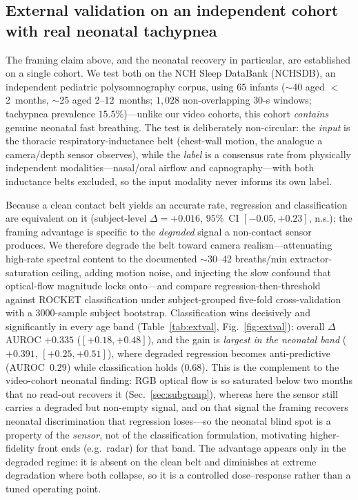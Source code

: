 \subsection{External validation on an independent cohort with real neonatal tachypnea}\label{sec:extval}
The framing claim above, and the neonatal recovery in particular, are established on a single
cohort. We test both on the NCH Sleep DataBank (NCHSDB), an independent pediatric polysomnography
corpus, using $65$ infants ($\sim$40 aged $<$2~months, $\sim$25 aged 2--12~months; $1{,}028$
non-overlapping $30$-s windows; tachypnea prevalence $15.5\%$)---unlike our video cohorts, this
cohort \emph{contains} genuine neonatal fast breathing. The test is deliberately non-circular: the
\emph{input} is the thoracic respiratory-inductance belt (chest-wall motion, the analogue a
camera/depth sensor observes), while the \emph{label} is a consensus rate from physically independent
modalities---nasal/oral airflow and capnography---with both inductance belts excluded, so the input
modality never informs its own label.

Because a clean contact belt yields an accurate rate, regression and classification are equivalent on
it (subject-level $\Delta{=}{+}0.016$, $95\%$~CI $[-0.05,{+}0.23]$, n.s.); the framing advantage is
specific to the \emph{degraded} signal a non-contact sensor produces. We therefore degrade the belt
toward camera realism---attenuating high-rate spectral content to the documented $\sim$30--42
breaths/min extractor-saturation ceiling, adding motion noise, and injecting the slow confound that
optical-flow magnitude locks onto---and compare regression-then-threshold against ROCKET
classification under subject-grouped five-fold cross-validation with a $3000$-sample subject
bootstrap. Classification wins decisively and significantly in every age band
(Table~\ref{tab:extval}, Fig.~\ref{fig:extval}): overall $\Delta$AUROC ${+}0.335$
($[{+}0.18,{+}0.48]$), and the gain is \emph{largest in the neonatal band} (${+}0.391$,
$[{+}0.25,{+}0.51]$), where degraded regression becomes anti-predictive (AUROC~$0.29$) while
classification holds ($0.68$). This is the complement to the video-cohort neonatal finding: RGB
optical flow is so saturated below two months that no read-out recovers it (Sec.~\ref{sec:subgroup}),
whereas here the sensor still carries a degraded but non-empty signal, and on that signal the framing
recovers neonatal discrimination that regression loses---so the neonatal blind spot is a property of
the \emph{sensor}, not of the classification formulation, motivating higher-fidelity front ends (e.g.\
radar) for that band. The advantage appears only in the degraded regime:
it is absent on the clean belt and diminishes at extreme degradation where both collapse, so it is a
controlled dose--response rather than a tuned operating point.

